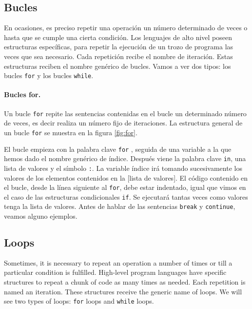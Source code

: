 \begin{paracol}{2}
\subsection{Bucles}
En ocasiones, es preciso repetir una operación un número determinado de veces o hasta que se cumple una cierta condición. Los lenguajes de alto nivel poseen estructuras específicas, para repetir la ejecución de un trozo de programa las veces que sea necesario. Cada repetición recibe el nombre de iteración. Estas estructuras reciben el nombre genérico de bucles. Vamos a ver dos tipos: los bucles \texttt{for} y los bucles \texttt{while}.

\paragraph{Bucles for.} Un bucle \texttt{for} repite las sentencias contenidas en el bucle un determinado número de veces, es decir realiza un número fijo de iteraciones. La estructura general de un bucle \texttt{for} se muestra en la figura \ref{fig:for}.

El bucle empieza con la palabra clave \texttt{for} , seguida de una variable a la que hemos dado el nombre genérico de índice. Después viene la palabra clave \texttt{in}, una lista de valores y el símbolo \texttt{:}. La variable índice irá tomando sucesivamente los valores de los elementos contenidos en la [lista de valores]. El código contenido en el bucle, desde la línea siguiente al \texttt{for}, debe estar indentado, igual que vimos en el caso de las estructuras condicionales \texttt{if}.  Se ejecutará tantas veces como valores tenga la lista de valores. Antes de hablar de las sentencias \texttt{break} y \texttt{continue}, veamos alguno ejemplos.

\switchcolumn
\subsection{Loops}
Sometimes, it is necessary to repeat an operation a number of times or till a particular condition is fulfilled. High-level program languages have specific structures to repeat a chunk of code as many times as needed. Each repetition is named an iteration. These structures receive the generic name of loops. We will see two types of loops: \texttt{for} loops and \texttt{while} loops.


\end{paracol}
